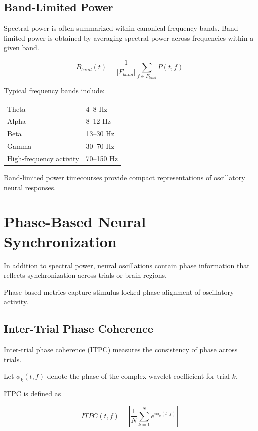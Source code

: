 \documentclass[11pt]{report}
\begin{document}
\section{Band-Limited Power}

Spectral power is often summarized within canonical frequency bands.
Band-limited power is obtained by averaging spectral power across
frequencies within a given band.

\begin{equation}
B_{band}(t) =
\frac{1}{|F_{band}|}
\sum_{f \in F_{band}} P(t,f)
\end{equation}

Typical frequency bands include:

\begin{center}
\begin{tabular}{ll}
Theta & 4--8 Hz \\
Alpha & 8--12 Hz \\
Beta & 13--30 Hz \\
Gamma & 30--70 Hz \\
High-frequency activity & 70--150 Hz
\end{tabular}
\end{center}

Band-limited power timecourses provide compact representations of
oscillatory neural responses.

\chapter{Phase-Based Neural Synchronization}

In addition to spectral power, neural oscillations contain phase
information that reflects synchronization across trials or brain
regions.

Phase-based metrics capture stimulus-locked phase alignment of
oscillatory activity.

\section{Inter-Trial Phase Coherence}

Inter-trial phase coherence (ITPC) measures the consistency of phase
across trials.

Let $\phi_k(t,f)$ denote the phase of the complex wavelet coefficient
for trial $k$.

ITPC is defined as

\begin{equation}
ITPC(t,f) =
\left|
\frac{1}{N}
\sum_{k=1}^{N}
e^{i\phi_k(t,f)}
\right|
\end{equation}
\end{document}
